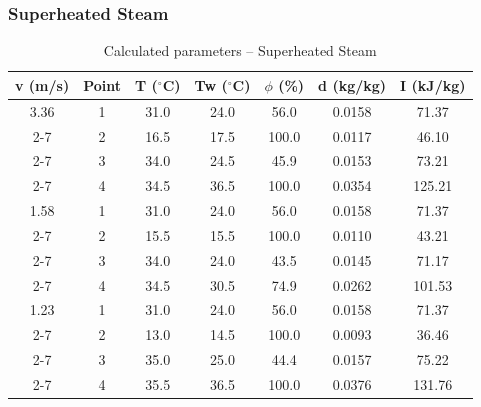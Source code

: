 \subsubsection{Superheated Steam}
\begin{table}[H]
\centering
\begin{tabular}{|c|c|c|c|c|c|c|}\hline
\textbf{v (m/s)} & \textbf{Point} & \textbf{T ($^\circ$C)} & \textbf{Tw ($^\circ$C)} & \textbf{$\phi$ (\%)} & \textbf{d (kg/kg)} & \textbf{I (kJ/kg)} \\\hline
3.36 & 1 & 31.0 & 24.0 & 56.0 & 0.0158 & 71.37 \\\cline{2-7}
 & 2 & 16.5 & 17.5 & 100.0 & 0.0117 & 46.10 \\\cline{2-7}
 & 3 & 34.0 & 24.5 & 45.9 & 0.0153 & 73.21 \\\cline{2-7}
 & 4 & 34.5 & 36.5 & 100.0 & 0.0354 & 125.21 \\\hline
1.58 & 1 & 31.0 & 24.0 & 56.0 & 0.0158 & 71.37 \\\cline{2-7}
 & 2 & 15.5 & 15.5 & 100.0 & 0.0110 & 43.21 \\\cline{2-7}
 & 3 & 34.0 & 24.0 & 43.5 & 0.0145 & 71.17 \\\cline{2-7}
 & 4 & 34.5 & 30.5 & 74.9 & 0.0262 & 101.53 \\\hline
1.23 & 1 & 31.0 & 24.0 & 56.0 & 0.0158 & 71.37 \\\cline{2-7}
 & 2 & 13.0 & 14.5 & 100.0 & 0.0093 & 36.46 \\\cline{2-7}
 & 3 & 35.0 & 25.0 & 44.4 & 0.0157 & 75.22 \\\cline{2-7}
 & 4 & 35.5 & 36.5 & 100.0 & 0.0376 & 131.76 \\\hline
\end{tabular}
\caption{Calculated parameters -- Superheated Steam}
\end{table}

